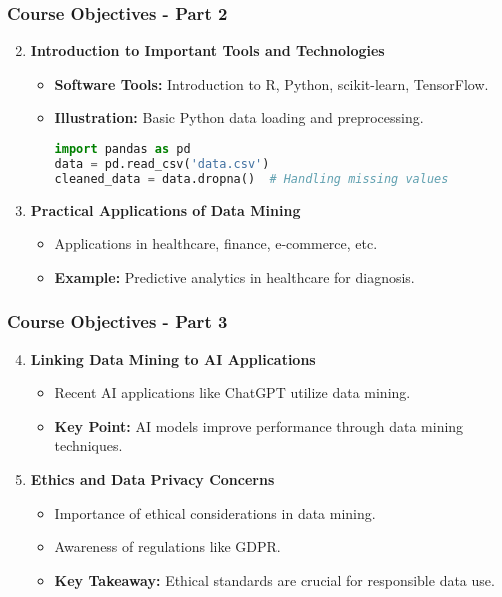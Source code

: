 \documentclass[aspectratio=169]{beamer}
\begin{document}
\begin{frame}[fragile]
    \frametitle{Course Objectives - Part 2}
    \begin{enumerate}
        \setcounter{enumi}{1}
        \item \textbf{Introduction to Important Tools and Technologies}
            \begin{itemize}
                \item \textbf{Software Tools:} Introduction to R, Python, scikit-learn, TensorFlow.
                \item \textbf{Illustration:} Basic Python data loading and preprocessing.
                \begin{lstlisting}[language=Python]
import pandas as pd
data = pd.read_csv('data.csv')
cleaned_data = data.dropna()  # Handling missing values
                \end{lstlisting}
            \end{itemize}

        \item \textbf{Practical Applications of Data Mining}
            \begin{itemize}
                \item Applications in healthcare, finance, e-commerce, etc.
                \item \textbf{Example:} Predictive analytics in healthcare for diagnosis.
            \end{itemize}
    \end{enumerate}
\end{frame}

\begin{frame}[fragile]
    \frametitle{Course Objectives - Part 3}
    \begin{enumerate}
        \setcounter{enumi}{3}
        \item \textbf{Linking Data Mining to AI Applications}
            \begin{itemize}
                \item Recent AI applications like ChatGPT utilize data mining.
                \item \textbf{Key Point:} AI models improve performance through data mining techniques.
            \end{itemize}

        \item \textbf{Ethics and Data Privacy Concerns}
            \begin{itemize}
                \item Importance of ethical considerations in data mining.
                \item Awareness of regulations like GDPR.
                \item \textbf{Key Takeaway:} Ethical standards are crucial for responsible data use.
            \end{itemize}
    \end{enumerate}
\end{frame}
\end{document}
